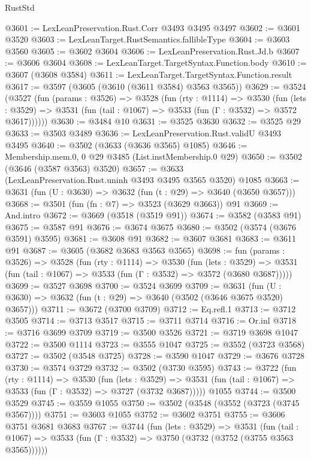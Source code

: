 \begin{lexlean}{RustStd}
\begin{coremodule}
@3601 := LexLeanPreservation.Rust.Corr @3493 @3495 @3497
@3602 := @3601 @3520
@3603 := LexLeanTarget.RustSemantics.fallibleType
@3604 := @3603 @3560
@3605 := @3602 @3604
@3606 := LexLeanPreservation.Rust.Jd.b
@3607 := @3606 @3604
@3608 := LexLeanTarget.TargetSyntax.Function.body
@3610 := @3607 (@3608 @3584)
@3611 := LexLeanTarget.TargetSyntax.Function.result
@3617 := @3597 (@3605 (@3610 (@3611 @3584) @3563 @3565))
@3629 := @3524
    (@3527
      (fun (params : @3526) =>
      @3528
        (fun (rty : @1114) =>
        @3530
          (fun (lets : @3529) =>
          @3531 (fun (tail : @1067) => @3533 (fun (Γ : @3532) => @3572 @3617))))))
@3630 := @3484 @10
@3631 := @3525 @3630
@3632 := @3525 @29
@3633 := @3503 @3489
@3636 := LexLeanPreservation.Rust.validU @3493 @3495
@3640 := @3502 (@3633 (@3636 @3565) @1085)
@3646 := Membership.mem.{0, 0} @29 @3485 (List.instMembership.{0} @29)
@3650 := @3502 (@3646 (@3587 @3563) @3520)
@3657 := @3633 (LexLeanPreservation.Rust.uninh @3493 @3495 @3565 @3520) @1085
@3663 := @3631 (fun (U : @3630) => @3632 (fun (t : @29) => @3640 (@3650 @3657)))
@3668 := @3501 (fun (fn : @7) => @3523 (@3629 @3663)) @91
@3669 := And.intro
@3672 := @3669 (@3518 (@3519 @91))
@3674 := @3582 (@3583 @91)
@3675 := @3587 @91
@3676 := @3674 @3675
@3680 := @3502 (@3574 (@3676 @3591) @3595)
@3681 := @3608 @91
@3682 := @3607 @3681
@3683 := @3611 @91
@3687 := @3605 (@3682 @3683 @3563 @3565)
@3698 := fun (params : @3526) =>
  @3528
    (fun (rty : @1114) =>
    @3530
      (fun (lets : @3529) =>
      @3531 (fun (tail : @1067) => @3533 (fun (Γ : @3532) => @3572 (@3680 @3687)))))
@3699 := @3527 @3698
@3700 := @3524 @3699
@3709 := @3631 (fun (U : @3630) => @3632 (fun (t : @29) => @3640 (@3502 (@3646 @3675 @3520) @3657)))
@3711 := @3672 (@3700 @3709)
@3712 := Eq.refl.{1}
@3713 := @3712 @3505
@3714 := @3713 @3517
@3715 := @3711 @3714
@3716 := Or.inl
@3718 := @3716 @3699 @3709
@3719 := @3500 @3526
@3721 := @3719 @3698 @1047
@3722 := @3500 @1114
@3723 := @3555 @1047
@3725 := @3552 (@3723 @3568)
@3727 := @3502 (@3548 @3725)
@3728 := @3590 @1047
@3729 := @3676 @3728
@3730 := @3574 @3729
@3732 := @3502 (@3730 @3595)
@3743 := @3722
    (fun (rty : @1114) =>
    @3530
      (fun (lets : @3529) =>
      @3531 (fun (tail : @1067) => @3533 (fun (Γ : @3532) => @3727 (@3732 @3687)))))
    @1055
@3744 := @3500 @3529
@3745 := @3559 @1055
@3750 := @3502 (@3548 (@3552 (@3723 (@3745 @3567))))
@3751 := @3603 @1055
@3752 := @3602 @3751
@3755 := @3606 @3751 @3681 @3683
@3767 := @3744
    (fun (lets : @3529) =>
    @3531
      (fun (tail : @1067) => @3533 (fun (Γ : @3532) => @3750 (@3732 (@3752 (@3755 @3563 @3565))))))

\end{coremodule}
\end{lexlean}
